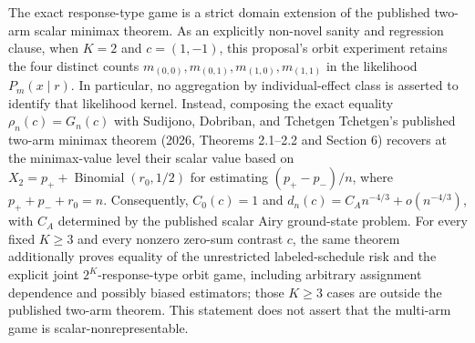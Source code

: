 The exact response-type game is a strict domain extension of the published two-arm scalar minimax theorem. As an explicitly non-novel sanity and regression clause, when \(K=2\) and \(c=(1,-1)\), this proposal's orbit experiment retains the four distinct counts \(m_{(0,0)},m_{(0,1)},m_{(1,0)},m_{(1,1)}\) in the likelihood \(P_m(x\mid r)\). In particular, no aggregation by individual-effect class is asserted to identify that likelihood kernel. Instead, composing the exact equality \(\rho_n(c)=G_n(c)\) with Sudijono, Dobriban, and Tchetgen Tchetgen's published two-arm minimax theorem (2026, Theorems 2.1--2.2 and Section 6) recovers at the minimax-value level their scalar value based on \(X_2=p_++\operatorname{Binomial}(r_0,1/2)\) for estimating \((p_+-p_-)/n\), where \(p_++p_-+r_0=n\). Consequently, \(C_0(c)=1\) and \(d_n(c)=C_A n^{-4/3}+o(n^{-4/3})\), with \(C_A\) determined by the published scalar Airy ground-state problem. For every fixed \(K\ge3\) and every nonzero zero-sum contrast \(c\), the same theorem additionally proves equality of the unrestricted labeled-schedule risk and the explicit joint \(2^K\)-response-type orbit game, including arbitrary assignment dependence and possibly biased estimators; those \(K\ge3\) cases are outside the published two-arm theorem. This statement does not assert that the multi-arm game is scalar-nonrepresentable.